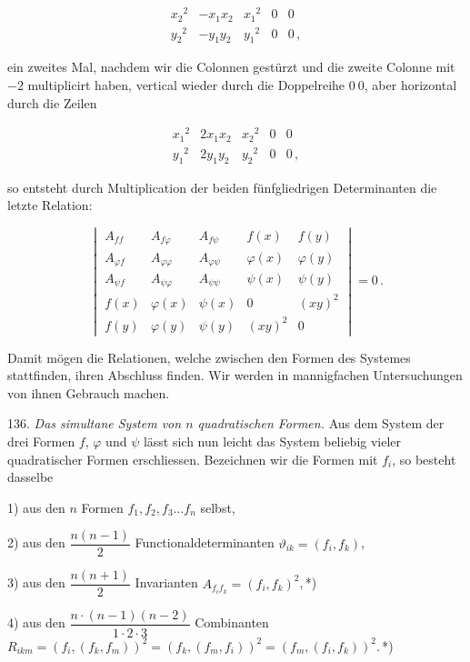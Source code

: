 \documentclass[11pt]{article}
\providecommand{\weberpage}[1]{}
\begin{document}
\[
\begin{aligned}
x_2{}^2 & -x_1x_2 & x_1{}^2 & 0 & 0 \\
y_2{}^2 & -y_1y_2 & y_1{}^2 & 0 & 0\,,
\end{aligned}
\]

ein zweites Mal, nachdem wir die Colonnen gest\"urzt und die zweite Colonne mit $-2$ multiplicirt haben, vertical wieder durch die Doppelreihe $0\ 0$, aber horizontal durch die Zeilen

\[
\begin{aligned}
x_1{}^2 & 2x_1x_2 & x_2{}^2 & 0 & 0 \\
y_1{}^2 & 2y_1y_2 & y_2{}^2 & 0 & 0\,,
\end{aligned}
\]


\weberpage{155}

so entsteht durch Multiplication der beiden f\"unfgliedrigen Determinanten die letzte Relation:

\[
\begin{vmatrix}
A_{ff} & A_{f\varphi} & A_{f\psi} & f(x) & f(y) \\
A_{\varphi f} & A_{\varphi\varphi} & A_{\varphi\psi} & \varphi(x) & \varphi(y) \\
A_{\psi f} & A_{\psi\varphi} & A_{\psi\psi} & \psi(x) & \psi(y) \\
f(x) & \varphi(x) & \psi(x) & 0 & (xy)^2 \\
f(y) & \varphi(y) & \psi(y) & (xy)^2 & 0
\end{vmatrix} = 0\,. \tag{VII}
\]

Damit m\"ogen die Relationen, welche zwischen den Formen des Systemes stattfinden, ihren Abschluss finden. Wir werden in mannigfachen Untersuchungen von ihnen Gebrauch machen.

136. \textit{Das simultane System von $n$ quadratischen Formen.} Aus dem System der drei Formen $f$, $\varphi$ und $\psi$ l\"asst sich nun leicht das System beliebig vieler quadratischer Formen erschliessen. Bezeichnen wir die Formen mit $f_i$, so besteht dasselbe

1) aus den $n$ Formen $f_1, f_2, f_3 \ldots f_n$ selbst,

2) aus den $\dfrac{n(n-1)}{2}$ Functionaldeterminanten $\vartheta_{ik} = (f_i, f_k)$,

3) aus den $\dfrac{n(n+1)}{2}$ Invarianten $A_{f_i f_k} = (f_i, f_k)^2$,\,*)

4) aus den $\dfrac{n\cdot(n-1)(n-2)}{1\cdot 2\cdot 3}$ Combinanten $R_{ikm} = (f_i, (f_k, f_m))^2 = (f_k, (f_m, f_i))^2 = (f_m, (f_i, f_k))^2$.\,*)
\end{document}
